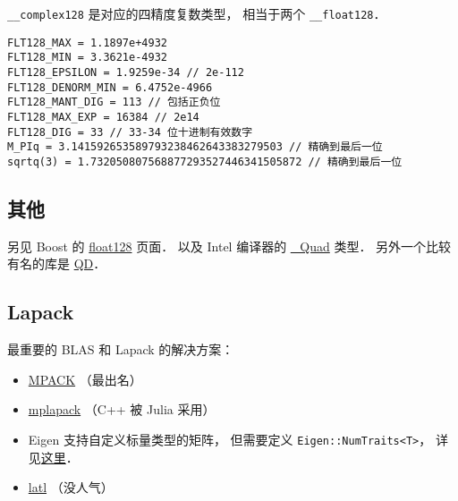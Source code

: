 \verb|__complex128| 是对应的四精度复数类型， 相当于两个 \verb|__float128|．

\begin{lstlisting}
FLT128_MAX = 1.1897e+4932
FLT128_MIN = 3.3621e-4932
FLT128_EPSILON = 1.9259e-34 // 2e-112
FLT128_DENORM_MIN = 6.4752e-4966
FLT128_MANT_DIG = 113 // 包括正负位
FLT128_MAX_EXP = 16384 // 2e14
FLT128_DIG = 33 // 33-34 位十进制有效数字
M_PIq = 3.141592653589793238462643383279503 // 精确到最后一位
sqrtq(3) = 1.732050807568877293527446341505872 // 精确到最后一位
\end{lstlisting}

\subsection{其他}
另见 Boost 的 \href{https://www.boost.org/doc/libs/develop/libs/multiprecision/doc/html/boost_multiprecision/tut/floats/float128.html}{float128} 页面． 以及 Intel 编译器的 \href{https://community.intel.com/t5/Intel-C-Compiler/Quad-precision-Quad-data-type/td-p/1218636}{_Quad} 类型． 另外一个比较有名的库是 \href{https://www.davidhbailey.com/dhbsoftware/}{QD}．

\subsection{Lapack}
最重要的 BLAS 和 Lapack 的解决方案：
\begin{itemize}
\item \href{http://mplapack.sourceforge.net/}{MPACK} （最出名）
\item \href{https://github.com/nakatamaho/mplapack}{mplapack} （C++ 被 Julia 采用）
\item Eigen 支持自定义标量类型的矩阵， 但需要定义 \verb|Eigen::NumTraits<T>|， 详见\href{https://eigen.tuxfamily.org/dox/TopicCustomizing_CustomScalar.html}{这里}．
\item \href{https://github.com/langou/latl}{latl} （没人气）
\end{itemize}
